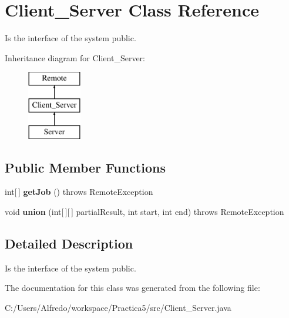 \hypertarget{interface_client___server}{}\section{Client\+\_\+\+Server Class Reference}
\label{interface_client___server}


Is the interface of the system  public.  


Inheritance diagram for Client\+\_\+\+Server\+:\begin{figure}[H]
\begin{center}
\leavevmode
\includegraphics[height=3.000000cm]{interface_client___server}
\end{center}
\end{figure}
\subsection*{Public Member Functions}
\begin{DoxyCompactItemize}
\item 
int\mbox{[}$\,$\mbox{]} {\bfseries get\+Job} ()  throws Remote\+Exception\hypertarget{interface_client___server_ad756f998891d7bd879b6c7dd386ae78e}{}\label{interface_client___server_ad756f998891d7bd879b6c7dd386ae78e}

\item 
void {\bfseries union} (int\mbox{[}$\,$\mbox{]}\mbox{[}$\,$\mbox{]} partial\+Result, int start, int end)  throws Remote\+Exception\hypertarget{interface_client___server_ad022e27663e0ecca6418be2ca332ba7b}{}\label{interface_client___server_ad022e27663e0ecca6418be2ca332ba7b}

\end{DoxyCompactItemize}


\subsection{Detailed Description}
Is the interface of the system  public. 

The documentation for this class was generated from the following file\+:\begin{DoxyCompactItemize}
\item 
C\+:/\+Users/\+Alfredo/workspace/\+Practica5/src/Client\+\_\+\+Server.\+java\end{DoxyCompactItemize}

